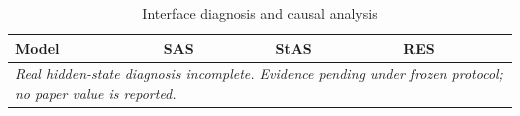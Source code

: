 \begin{table}[t]
\centering
\caption{Interface diagnosis and causal analysis}
\begin{tabular}{llll}
\toprule
Model & SAS & StAS & RES \\
\midrule
\multicolumn{4}{l}{\textit{Real hidden-state diagnosis incomplete. Evidence pending under frozen protocol; no paper value is reported.}} \\
\bottomrule
\end{tabular}
\end{table}
